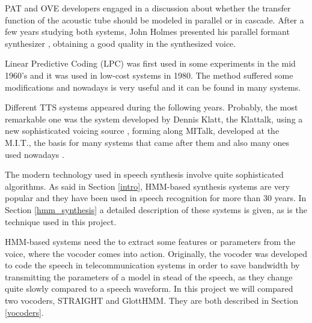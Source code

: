 PAT and OVE developers engaged in a discussion about whether the transfer function of the acoustic tube should be modeled in parallel or in cascade. After a few years studying both systems, John Holmes presented his parallel formant synthesizer \cite{Klatt87}, obtaining a good quality in the synthesized voice.

Linear Predictive Coding (LPC) was first used in some experiments in the mid 1960's \cite{Schroeder93} and it was used in low-cost systems in 1980. The method suffered some modifications and nowadays is very useful and it can be found in many systems. 

Different TTS systems appeared during the following years. Probably, the most remarkable one was the system developed by Dennis Klatt, the Klattalk, using a new sophisticated voicing source \cite{Klatt87}, forming along MITalk, developed at the M.I.T., the basis for many systems that came after them and also many ones used nowadays \cite{LemmettyMSc}.

The modern technology used in speech synthesis involve quite sophisticated algorithms. As said in Section \ref{intro}, HMM-based synthesis systems are very popular and they have been used in speech recognition for more than 30 years. In Section \ref{hmm_synthesis} a detailed description of these systems is given, as is the technique used in this project.

HMM-based systems need the to extract some features or parameters from the voice, where the vocoder comes into action. Originally, the vocoder was developed to code the speech in telecommunication systems in order to save bandwidth by transmitting the parameters of a model in stead of the speech, as they change quite slowly compared to a speech waveform. In this project we will compared two vocoders, STRAIGHT and GlottHMM. They are both described in Section \ref{vocoders}. 